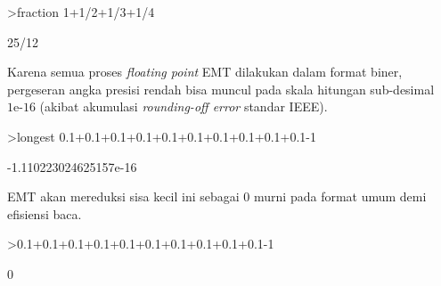 \documentclass[a4paper,11pt,oneside,enabledeprecatedfontcommands]{scrbook}
\newenvironment{eulernotebook}{}{}
\newenvironment{eulercomment}{\par\medskip\noindent}{\par\medskip}
\begin{document}
\begin{eulernotebook}
\begin{eulerprompt}
>fraction 1+1/2+1/3+1/4
\end{eulerprompt}
\begin{euleroutput}
25/12
\end{euleroutput}
\begin{eulercomment}
Karena semua proses \emph{floating point} EMT dilakukan dalam format biner, pergeseran angka presisi rendah bisa muncul pada skala hitungan sub-desimal $1\text{e-}16$ (akibat akumulasi \emph{rounding-off error} standar IEEE).
\end{eulercomment}
\begin{eulerprompt}
>longest 0.1+0.1+0.1+0.1+0.1+0.1+0.1+0.1+0.1+0.1-1
\end{eulerprompt}
\begin{euleroutput}
 -1.110223024625157e-16 
\end{euleroutput}
\begin{eulercomment}
EMT akan mereduksi sisa kecil ini sebagai $0$ murni pada format umum demi efisiensi baca.
\end{eulercomment}
\begin{eulerprompt}
>0.1+0.1+0.1+0.1+0.1+0.1+0.1+0.1+0.1+0.1-1
\end{eulerprompt}
\begin{euleroutput}
0
\end{euleroutput}


\end{eulernotebook}
\end{document}
